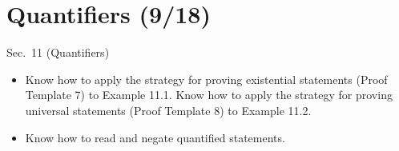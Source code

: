 \documentclass[11pt]{article}
\begin{document}
\section*{Quantifiers (9/18)}
\begin{textbook}{Sec.~11 (Quantifiers)}
\begin{itemize}[leftmargin=*, nosep]
\item Know how to apply the strategy for proving existential statements (Proof Template 7) to Example 11.1. Know how to apply the strategy for proving universal statements (Proof Template 8) to Example 11.2.
\item Know how to read and negate quantified statements.
\end{itemize}
\end{textbook}
\end{document}

